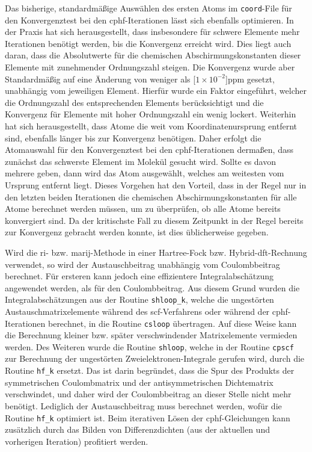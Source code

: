 \bigskip
Das bisherige, standardmäßige Auswählen des ersten Atoms im \texttt{coord}-File für den Konvergenztest bei den \ac{cphf}-Iterationen lässt sich ebenfalls optimieren. In der Praxis hat sich herausgestellt, dass insbesondere für schwere Elemente mehr Iterationen benötigt werden, bis die Konvergenz erreicht wird. Dies liegt auch daran, dass die Absolutwerte für die chemischen Abschirmungskonstanten dieser Elemente mit zunehmender Ordnungszahl steigen. Die Konvergenz wurde aber Standardmäßig auf eine Änderung von weniger als \unit[$1\times 10^{-2}$]{ppm} gesetzt, unabhängig vom jeweiligen Element. Hierfür wurde ein Faktor eingeführt, welcher die Ordnungszahl des entsprechenden Elements berücksichtigt und die Konvergenz für Elemente mit hoher Ordnungszahl ein wenig lockert. Weiterhin hat sich herausgestellt, dass Atome die weit vom Koordinatenursprung entfernt sind, ebenfalls länger bis zur Konvergenz benötigen. Daher erfolgt die Atomauswahl für den Konvergenztest bei den \ac{cphf}-Iterationen dermaßen, dass zunächst das schwerste Element im Molekül gesucht wird. Sollte es davon mehrere geben, dann wird das Atom ausgewählt, welches am weitesten vom Ursprung entfernt liegt. Dieses Vorgehen hat den Vorteil, dass in der Regel nur in den letzten beiden Iterationen die chemischen Abschirmungskonstanten für alle Atome berechnet werden müssen, um zu überprüfen, ob alle Atome bereits konvergiert sind. Da der kritischste Fall zu diesem Zeitpunkt in der Regel bereits zur Konvergenz gebracht werden konnte, ist dies üblicherweise gegeben.

\bigskip
Wird die \ac{ri}- bzw. \ac{marij}-Methode in einer Hartree-Fock bzw. Hybrid-\ac{dft}-Rechnung verwendet, so wird der Austauschbeitrag unabhängig vom Coulombbeitrag berechnet. Für ersteren kann jedoch eine effizientere Integralabschätzung\supercite{ochsenfeld1998linear} angewendet werden, als für den Coulombbeitrag. Aus diesem Grund wurden die Integralabschätzungen aus der Routine \texttt{shloop\_k}, welche die ungestörten Austauschmatrixelemente während des \ac{scf}-Verfahrens oder während der \ac{cphf}-Iterationen berechnet, in die Routine \texttt{csloop} übertragen. Auf diese Weise kann die Berechnung kleiner bzw. später verschwindender Matrixelemente vermieden werden. Des Weiteren wurde die Routine \texttt{shloop}, welche in der Routine \texttt{cpscf} zur Berechnung der ungestörten Zweielektronen-Integrale gerufen wird, durch die Routine \texttt{hf\_k} ersetzt. Das ist darin begründet, dass die Spur des Produkts der symmetrischen Coulombmatrix und der antisymmetrischen Dichtematrix verschwindet, und daher wird der Coulombbeitrag an dieser Stelle nicht mehr benötigt. Lediglich der Austauschbeitrag muss berechnet werden, wofür die Routine \texttt{hf\_k} optimiert ist. Beim iterativen Lösen der \ac{cphf}-Gleichungen kann zusätzlich durch das Bilden von Differenzdichten (aus der aktuellen und vorherigen Iteration) profitiert werden. 

